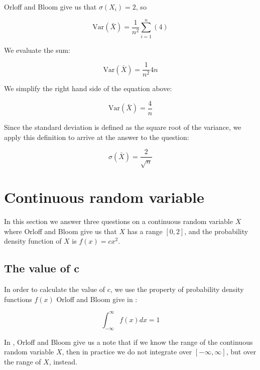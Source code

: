 \documentclass[a4paper,11pt]{article}
\begin{document}
Orloff and Bloom give us that $\sigma(X_{i})=2$, so

\begin{equation}
\text{Var}\left( \bar{X} \right)
  = \frac{1}{n^{2}} \sum_{i=1}^{n} \left( 4 \right)
\end{equation}

We evaluate the sum:

\begin{equation}
\text{Var}\left( \bar{X} \right)
  = \frac{1}{n^{2}} 4n
\end{equation}

We simplify the right hand side of the equation above:

\begin{equation}
\text{Var}\left( \bar{X} \right)
  =  \frac{4}{n}
\end{equation}

Since the standard deviation is defined as the square root of the variance, we
apply this definition to arrive at the answer to the question:

\begin{equation}
\sigma \left( \bar{X} \right)
  =  \frac{2}{\sqrt{n}}
\end{equation}

\section{Continuous random variable}
In this section we answer three questions on a continuous random variable $X$
where Orloff and Bloom give us that $X$ has a range $\left[ 0, 2 \right]$, and
the probability density function of $X$ is $f \left( x \right) = cx^{2}$.

\subsection{The value of c}
In order to calculate the value of $c$, we use the property of probability
density functions $f\left(x \right)$ Orloff and Bloom give in \cite{reading5b}:

\begin{equation}
  \int_{-\infty}^{\infty} f \left( x \right) dx = 1
\end{equation}

In \cite{reading5b}, Orloff and Bloom give us a note that if we know the range
of the continuous random variable $X$, then in practice we do not integrate
over $\left[ -\infty, \infty \right]$, but over the range of $X$, instead.
\end{document}
